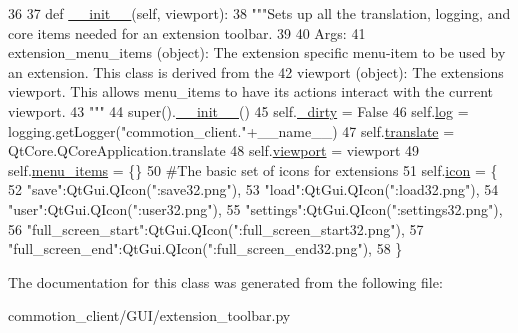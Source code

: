 \begin{DoxyCode}
36 
37     \textcolor{keyword}{def }\hyperlink{classcommotion__client_1_1GUI_1_1extension__toolbar_1_1ExtensionToolBar_a29e92f0e66f5f056be55e3a5ef7f2fd8}{\_\_init\_\_}(self, viewport):
38         \textcolor{stringliteral}{"""Sets up all the translation, logging, and core items needed for an extension toolbar.}
39 \textcolor{stringliteral}{        }
40 \textcolor{stringliteral}{        Args:}
41 \textcolor{stringliteral}{          extension\_menu\_items (object): The extension specific menu-item to be used by an extension. This
       class is derived from the  }
42 \textcolor{stringliteral}{          viewport (object): The extensions viewport. This allows menu\_items to have its actions interact
       with the current viewport.        }
43 \textcolor{stringliteral}{        """}
44         super().\hyperlink{classcommotion__client_1_1GUI_1_1extension__toolbar_1_1ExtensionToolBar_a29e92f0e66f5f056be55e3a5ef7f2fd8}{\_\_init\_\_}()
45         self.\hyperlink{classcommotion__client_1_1GUI_1_1extension__toolbar_1_1ExtensionToolBar_a84233fa2bbebfb96f4c6c490487b4f87}{\_dirty} = \textcolor{keyword}{False}
46         self.\hyperlink{classcommotion__client_1_1GUI_1_1extension__toolbar_1_1ExtensionToolBar_a6319ad6aa6c0480e17413b5c8a018d5f}{log} = logging.getLogger(\textcolor{stringliteral}{"commotion\_client."}+\_\_name\_\_)
47         self.\hyperlink{classcommotion__client_1_1GUI_1_1extension__toolbar_1_1ExtensionToolBar_ad52b111af7587b8ed8fb2e1703f8251b}{translate} = QtCore.QCoreApplication.translate
48         self.\hyperlink{classcommotion__client_1_1GUI_1_1extension__toolbar_1_1ExtensionToolBar_ae4fb6875e8968fb1b48a516117ee010f}{viewport} = viewport
49         self.\hyperlink{classcommotion__client_1_1GUI_1_1extension__toolbar_1_1ExtensionToolBar_a4c951281d81006ea5a1603030f4fa799}{menu\_items} = \{\}
50         \textcolor{comment}{#The basic set of icons for extensions}
51         self.\hyperlink{classcommotion__client_1_1GUI_1_1extension__toolbar_1_1ExtensionToolBar_afa628724b1895e1fe4f5bd5605ead016}{icon} = \{
52             \textcolor{stringliteral}{"save"}:QtGui.QIcon(\textcolor{stringliteral}{":save32.png"}),
53             \textcolor{stringliteral}{"load"}:QtGui.QIcon(\textcolor{stringliteral}{":load32.png"}),
54             \textcolor{stringliteral}{"user"}:QtGui.QIcon(\textcolor{stringliteral}{":user32.png"}),
55             \textcolor{stringliteral}{"settings"}:QtGui.QIcon(\textcolor{stringliteral}{":settings32.png"}),
56             \textcolor{stringliteral}{"full\_screen\_start"}:QtGui.QIcon(\textcolor{stringliteral}{":full\_screen\_start32.png"}),
57             \textcolor{stringliteral}{"full\_screen\_end"}:QtGui.QIcon(\textcolor{stringliteral}{":full\_screen\_end32.png"}),
58         \}

\end{DoxyCode}


The documentation for this class was generated from the following file\-:\begin{DoxyCompactItemize}
\item 
commotion\-\_\-client/\-G\-U\-I/extension\-\_\-toolbar.\-py\end{DoxyCompactItemize}
